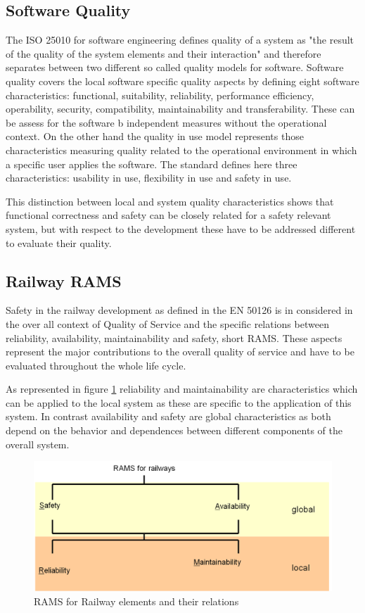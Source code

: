 \documentclass{template/openetcs_report}
\begin{document}
\subsection{Software Quality}

The ISO 25010 for software engineering defines quality of a system as "the result of the quality of the system elements and their interaction" and therefore separates between two different so called quality models for software. Software quality covers the local software specific quality aspects by defining eight software characteristics: functional, suitability, reliability, performance efficiency, operability, security, compatibility, maintainability and transferability.
These can be assess for the software b independent measures without the operational  context.
On the other hand the quality in use model represents those characteristics measuring quality related to the operational environment in which a specific user applies the software. The standard defines here three characteristics: 
usability in use, flexibility in use and safety in use.

This distinction between local and system quality characteristics shows that functional correctness and safety can be closely related for a safety relevant system, but with respect to the development these have to be addressed different to evaluate their quality.

\subsection{Railway RAMS}

Safety in the railway development as defined in the EN 50126 is in considered in the over all context of Quality of Service and the specific relations between reliability, availability, maintainability and safety, short RAMS. These aspects represent the major contributions to the overall quality of service and have to be evaluated throughout the whole life cycle.

As represented in figure \ref{fig:RAMS-EN50126} reliability and maintainability are characteristics which can be applied to the local system as these are specific to the application of this system. In contrast availability and safety are global characteristics as both depend on the behavior and dependences between different components of the overall system.

\begin{figure}[htbp]
\centering
\includegraphics[width=0.7\linewidth]{images/bld_RAMS-Railway-50126}
\caption{RAMS for Railway elements and their relations \cite{Schnieder.2013}}
\label{fig:RAMS-EN50126}
\end{figure}
\end{document}
